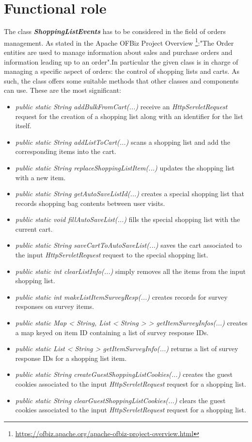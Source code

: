 \documentclass[11pt,a4paper]{report}
\begin{document}
\section{Functional role}
The class \textbf{\textit{ShoppingListEvents}} has to be considered in the field of orders management. As stated in the Apache OFBiz\textsuperscript{\textregistered} Project Overview \footnote{\url{https://ofbiz.apache.org/apache-ofbiz-project-overview.html}}:"The Order entities are used to manage information about sales and purchase orders and information leading up to an order".In particular the given class is in charge of managing a specific aspect of orders: the control of shopping lists and carts. As such, the class offers some suitable methods that other classes and components can use. These are the most significant:
\begin{itemize}
	\item \textit{public static String addBulkFromCart(...)} receive an \textit{HttpServletRequest} request for the creation of a shopping list along with an identifier for the list itself.
	\item \textit{public static String addListToCart(...)} scans a shopping list and add the corresponding items into the cart.
	\item \textit{public static String replaceShoppingListItem(...)} updates the shopping list with a new item.
	\item \textit{public static String getAutoSaveListId(...)} creates a special shopping list that records shopping bag contents between user visits.
	\item \textit{public static void fillAutoSaveList(...)} fills the special shopping list with the current cart.
	\item \textit{public static String saveCartToAutoSaveList(...)} saves the cart associated to the input \textit{HttpServletRequest} request to the special shopping list.
	\item \textit{public static int clearListInfo(...)} simply removes all the items from the input shopping list.
	\item \textit{public static int makeListItemSurveyResp(...)} creates records for survey responses on survey items.
	\item \textit{public static Map < String, List < String > > getItemSurveyInfos(...)} creates a  map keyed on item ID containing a list of survey response IDs.
	\item \textit{public static List < String > getItemSurveyInfo(...)} returns a list of survey response IDs for a shopping list item.
	\item \textit{public static String createGuestShoppingListCookies(...)} creates the guest cookies associated to the input \textit{HttpServletRequest} request for a shopping list.
	\item \textit{public static String clearGuestShoppingListCookies(...)} clears the guest cookies associated to the input \textit{HttpServletRequest} request for a shopping list. 
\end{itemize}
\end{document}
